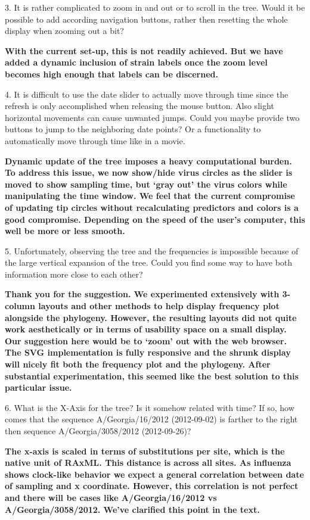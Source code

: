 \documentclass[11pt,oneside,letterpaper]{article}
\begin{document}
3. It is rather complicated to zoom in and out or to scroll in the tree. Would it be possible to add according navigation buttons, rather then resetting the whole display when zooming out a bit?

{\bf With the current set-up, this is not readily achieved. But we have added a dynamic inclusion of strain labels once the zoom level becomes high enough that labels can be discerned.}

4. It is difficult to use the date slider to actually move through time since the refresh is only accomplished when releasing the mouse button. Also slight horizontal movements can cause unwanted jumps. Could you maybe provide two buttons to jump to the neighboring date points? Or a functionality to automatically move through time like in a movie.

{\bf Dynamic update of the tree imposes a heavy computational burden. To address this issue, we now show/hide virus circles as the slider is moved to show sampling time, but `gray out' the virus colors while manipulating the time window. We feel that the current compromise of updating tip circles without recalculating predictors and colors is a good compromise. Depending on the speed of the user's computer, this well be more or less smooth.}

5. Unfortunately, observing the tree and the frequencies is impossible because of the large vertical expansion of the tree. Could you find some way to have both information more close to each other?

\textbf{Thank you for the suggestion. We experimented extensively with 3-column layouts and other methods to help display frequency plot alongside the phylogeny. However, the resulting layouts did not quite work aesthetically or in terms of usability space on a small display. Our suggestion here would be to `zoom' out with the web browser. The SVG implementation is fully responsive and the shrunk display will nicely fit both the frequency plot and the phylogeny. After substantial experimentation, this seemed like the best solution to this particular issue.}

6. What is the X-Axis for the tree? Is it somehow related with time? If so, how comes that the sequence A/Georgia/16/2012 (2012-09-02) is farther to the right then sequence A/Georgia/3058/2012 (2012-09-26)?

\textbf{The x-axis is scaled in terms of substitutions per site, which is the native unit of RAxML. This distance is across all sites. As influenza shows clock-like behavior we expect a general correlation between date of sampling and x coordinate. However, this correlation is not perfect and there will be cases like A/Georgia/16/2012 vs A/Georgia/3058/2012. We've clarified this point in the text.}
\end{document}
